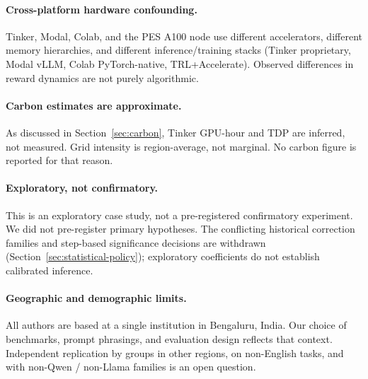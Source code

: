 \paragraph{Cross-platform hardware confounding.}
Tinker, Modal, Colab, and the PES A100 node use different accelerators,
different memory hierarchies, and different inference/training stacks
(Tinker proprietary, Modal vLLM, Colab PyTorch-native, TRL+Accelerate).
Observed differences in reward dynamics are not purely algorithmic.

\paragraph{Carbon estimates are approximate.}
As discussed in Section~\ref{sec:carbon}, Tinker GPU-hour and TDP are
inferred, not measured. Grid intensity is region-average, not marginal.
No carbon figure is reported for that reason.

\paragraph{Exploratory, not confirmatory.}
This is an exploratory case study, not a pre-registered confirmatory
experiment. We did not pre-register primary hypotheses. The conflicting historical correction families and step-based significance
decisions are withdrawn (Section~\ref{sec:statistical-policy}); exploratory
coefficients do not establish calibrated inference.

\paragraph{Geographic and demographic limits.}
All authors are based at a single institution in Bengaluru, India. Our
choice of benchmarks, prompt phrasings, and evaluation design reflects
that context. Independent replication by groups in other regions, on
non-English tasks, and with non-Qwen / non-Llama families is an open
question.

